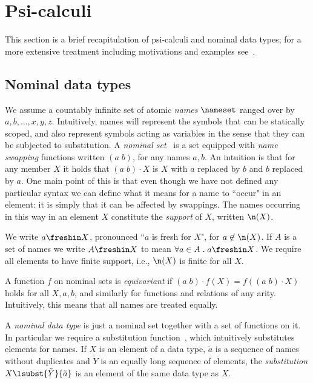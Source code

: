\documentclass{eptcs}
\theoremstyle{definition}
\begin{document}
\section{Psi-calculi}\label{sec:psi}

This section is a brief recapitulation of psi-calculi and nominal data types; for a more extensive treatment including motivations and examples see~\cite{bengtson.johansson.ea:psi-calculi}.

\subsection{Nominal data types}

We assume a countably infinite set of atomic {\em names} $\nameset$ ranged over by $a,b,\ldots,x,y,z$. Intuitively, names will represent the symbols that can be statically scoped, and also represent symbols acting as variables in the sense that they can be subjected to substitution. 
A {\em nominal set}~\cite{PittsAM:nomlfo-jv,Gabbay01anew} is a set equipped with {\em name swapping} functions written $(a\;b)$, for any names $a,b$. An intuition is that for any member $X$ it holds that $(a\;b)\cdot X$ is $X$ with  $a$ replaced by $b$ and  $b$ replaced by $a$. One main point of this is that  even though we have not defined any particular syntax we can define what it means for a name to ``occur" in an element: it is simply that it can be affected by swappings. 
The names occurring in this way  in an element $X$ constitute the  {\em support} of $X$, written $\n(X)$.

  We write $a \freshin X$, pronounced ``$a$ is fresh for $X$", for $a \not\in \n(X)$.  If $A$ is a set of names we write $A\freshin X$ to mean $\forall a \in A \;.\; a \freshin X$.
We require all elements to have finite support, i.e., $\n(X)$ is finite for all
$X$.


A function $f$ on nominal sets is {\em equivariant} if $(a\;b)\cdot f(X)
= f((a\;b)\cdot X)$ holds for all $X,a,b$, and similarly for functions and
relations of any
arity. Intuitively, this means that all
names are treated equally.

A {\em nominal data type} is just a nominal set together with a set of functions on it. In particular we require a substitution function~\cite{bengtson.parrow:psi-calculi-isabelle}, which intuitively substitutes elements  for  names. If $X$ is an element of a data type, $\tilde{a}$ is a sequence of names without duplicates and $\tilde{Y}$ is an equally long sequence of elements, the {\em substitution}
$X\lsubst{\tilde{Y}}{\tilde{a}}$ is an element of the same data type as $X$. 
\end{document}
